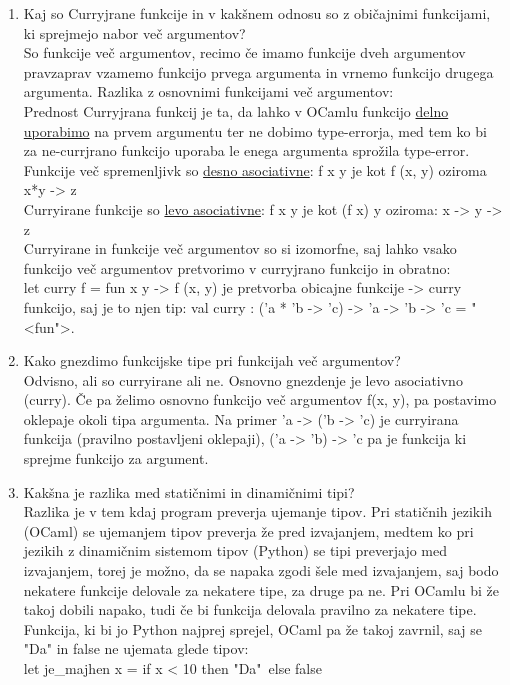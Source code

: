 \documentclass[a4paper]{article}
\begin{document}
\begin{enumerate}
        \item Kaj so Curryjrane funkcije in v kakšnem odnosu so z običajnimi funkcijami, ki sprejmejo nabor več argumentov?\\
        So funkcije več argumentov, recimo če imamo funkcije dveh argumentov pravzaprav vzamemo funkcijo prvega argumenta in vrnemo funkcijo drugega argumenta. Razlika z osnovnimi funkcijami več argumentov:\\
        Prednost Curryjrana funkcij je ta, da lahko v OCamlu funkcijo \underline{delno uporabimo} na prvem argumentu ter ne dobimo type-errorja, med tem ko bi za ne-currjrano funkcijo uporaba le enega argumenta sprožila type-error.
        Funkcije več spremenljivk so \underline{desno asociativne}: f x y je kot f (x, y) oziroma x*y -> z\\
        Curryirane funkcije so \underline{levo asociativne}: f x y je kot (f x) y oziroma: x -> y -> z\\
        Curryirane in funkcije več argumentov so si izomorfne, saj lahko vsako funkcijo več argumentov pretvorimo v curryjrano funkcijo in obratno:\\
        let curry f = fun x y -> f (x, y) je pretvorba obicajne funkcije -> curry funkcijo, saj je to njen tip: val curry : ('a * 'b -> 'c) -> 'a -> 'b -> 'c = "<fun">.
    
        \item Kako gnezdimo funkcijske tipe pri funkcijah več argumentov?\\
        Odvisno, ali so curryirane ali ne. Osnovno gnezdenje je levo asociativno (curry). Če pa želimo osnovno funkcijo več argumentov f(x, y), pa postavimo oklepaje okoli tipa argumenta. Na primer 'a -> ('b -> 'c) je curryirana funkcija (pravilno postavljeni oklepaji), ('a -> 'b) -> 'c pa je funkcija ki sprejme funkcijo za argument.
    
        \item Kakšna je razlika med statičnimi in dinamičnimi tipi?\\
        Razlika je v tem kdaj program preverja ujemanje tipov. Pri statičnih jezikih (OCaml) se ujemanjem tipov preverja že pred izvajanjem, medtem ko pri jezikih z dinamičnim sistemom tipov (Python) se tipi preverjajo med izvajanjem, torej je možno, da se napaka zgodi šele med izvajanjem, saj bodo nekatere funkcije delovale za nekatere tipe, za druge pa ne. Pri OCamlu bi že takoj dobili napako, tudi če bi funkcija delovala pravilno za nekatere tipe.\\
        Funkcija, ki bi jo Python najprej sprejel, OCaml pa že takoj zavrnil, saj se "Da" in false ne ujemata glede tipov:\\
        let je\_majhen x =
            if x < 10 then "Da"\ else false


\end{enumerate}
\end{document}
